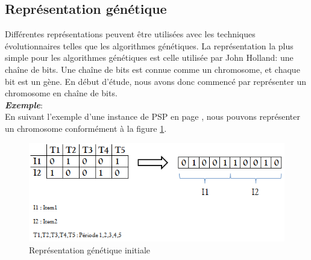 	\subsection{Représentation génétique}
	Différentes représentations peuvent être utilisées avec les techniques évolutionnaires telles que les algorithmes génétiques. La représentation la plus simple pour les algorithmes génétiques est celle utilisée par John Holland: une chaîne de bits. Une chaîne de bits est connue comme un chromosome, et chaque bit est un gène. En début d'étude, nous avons donc commencé par représenter un chromosome en chaîne de bits. \\
	\textsl{\textbf{Exemple}}:\\
	\hspace*{.5cm} En suivant l'exemple d'une instance de PSP en page \pageref{sec:problem_description}, nous pouvons représenter un chromosome conformément à la figure \ref{fig:init_gene_repr}.
	
	\begin{figure}[h]
		\begin{center}
			\includegraphics[scale=.5]{images/init_gene_repr.png}
			\caption{Représentation génétique initiale}
			\label{fig:init_gene_repr}
		\end{center}
	\end{figure}
	

